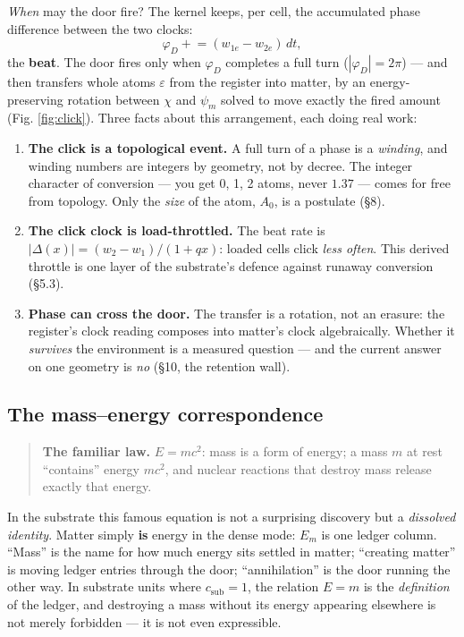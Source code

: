 \emph{When} may the door fire? The kernel keeps, per cell, the
accumulated phase difference between the two clocks:
\[\varphi_D \mathrel{+}= (w_{1e} - w_{2e})\,dt,\] the \textbf{beat}. The
door fires only when \(\varphi_D\) completes a full turn
(\(|\varphi_D| = 2\pi\)) --- and then transfers whole atoms
\(\varepsilon\) from the register into matter, by an energy-preserving
rotation between \(\chi\) and \(\psi_m\) solved to move exactly the
fired amount (Fig. \ref{fig:click}). Three facts about this arrangement,
each doing real work:

\begin{enumerate}
\def\labelenumi{\arabic{enumi}.}
\tightlist
\item
  \textbf{The click is a topological event.} A full turn of a phase is a
  \emph{winding}, and winding numbers are integers by geometry, not by
  decree. The integer character of conversion --- you get 0, 1, 2 atoms,
  never \(1.37\) --- comes for free from topology. Only the \emph{size}
  of the atom, \(A_0\), is a postulate (§8).
\item
  \textbf{The click clock is load-throttled.} The beat rate is
  \(|\Delta(x)| = (w_2 - w_1)/(1+qx)\): loaded cells click \emph{less
  often}. This derived throttle is one layer of the substrate's defence
  against runaway conversion (§5.3).
\item
  \textbf{Phase can cross the door.} The transfer is a rotation, not an
  erasure: the register's clock reading composes into matter's clock
  algebraically. Whether it \emph{survives} the environment is a
  measured question --- and the current answer on one geometry is
  \emph{no} (§10, the retention wall).
\end{enumerate}

\subsection{The mass--energy
correspondence}\label{the-massenergy-correspondence}

\begin{quote}
\textbf{The familiar law.} \(E = mc^2\): mass is a form of energy; a
mass \(m\) at rest ``contains'' energy \(mc^2\), and nuclear reactions
that destroy mass release exactly that energy.
\end{quote}

In the substrate this famous equation is not a surprising discovery but
a \emph{dissolved identity}. Matter simply \textbf{is} energy in the
dense mode: \(E_m\) is one ledger column. ``Mass'' is the name for how
much energy sits settled in matter; ``creating matter'' is moving ledger
entries through the door; ``annihilation'' is the door running the other
way. In substrate units where \(c_{\mathrm{sub}} = 1\), the relation
\(E = m\) is the \emph{definition} of the ledger, and destroying a mass
without its energy appearing elsewhere is not merely forbidden --- it is
not even expressible.


